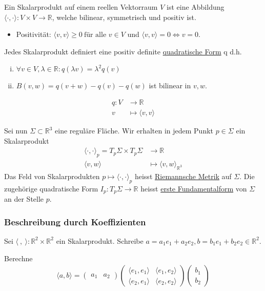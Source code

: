 \documentclass[../main.tex]{subfiles}
\begin{document}
\begin{recall}
Ein Skalarprodukt auf einem reellen Vektorraum $V$ ist eine Abbildung $\langle \cdot , \cdot \rangle : V \times V \to \mathbb{R}$, welche bilinear, symmetrisch und positiv ist.
\begin{itemize}
    \item Positivität: $\langle v, v \rangle \ge 0 \ \text{für alle } v \in V$ und $\langle v, v \rangle = 0 \iff v = 0$.
\end{itemize}
Jedes Skalarprodukt definiert eine positiv definite \underline{quadratische Form} q d.h.
\begin{enumerate}[(i)]
    \item $\forall v \in V, \lambda \in \mathbb{R} : q(\lambda v) = \lambda ^2 q(v)$
    \item $B(v,w) = q(v+w) - q(v) - q(w)$ ist bilinear in $v,w$.
\end{enumerate}
\begin{align*}
    q : V & \to \mathbb{R} \\
    v & \mapsto \langle v,v \rangle 
\end{align*}
\end{recall}

Sei nun $ \Sigma \subset \mathbb{R}^3$ eine reguläre Fläche. Wir erhalten in jedem Punkt $p \in \Sigma$ ein Skalarprodukt
\begin{align*}
    \langle \cdot , \cdot \rangle _p = T_p \Sigma \times T_p \Sigma & \to \mathbb{R} \\
    \langle v, w \rangle & \mapsto \langle v, w \rangle _{\mathbb{R}^3}
\end{align*}
Das Feld von Skalarprodukten $p \mapsto \langle \cdot , \cdot \rangle _p $ heisst \underline{Riemannsche Metrik} auf $ \Sigma$. Die zugehörige quadratische Form $ I_p : T_p \Sigma \to \mathbb{R}$ heisst \underline{erste Fundamentalform} von $\Sigma$ an der Stelle $p$.
\subsubsection*{Beschreibung durch Koeffizienten}

Sei $\langle \ , \ \rangle : \mathbb{R}^2 \times \mathbb{R}^2$ ein Skalarprodukt.
Schreibe $a = a_1e_1 + a_2e_2, b = b_1e_1 + b_2e_2 \in \mathbb{R}^2$.

Berechne \begin{align*}
    \langle a, b \rangle = \begin{pmatrix}
        a_1 & a_2
    \end{pmatrix} \begin{pmatrix}
        \langle e_1, e_1 \rangle & \langle e_1, e_2 \rangle \\
        \langle e_2, e_1 \rangle & \langle e_2, e_2 \rangle
    \end{pmatrix} \begin{pmatrix}
        b_1 \\ b_2
    \end{pmatrix}
\end{align*}
\end{document}
